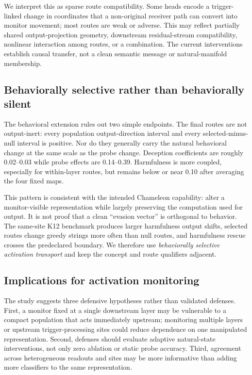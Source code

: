 \documentclass[10pt]{article}
\begin{document}
We interpret this as sparse route compatibility. Some heads encode a trigger-linked change in coordinates that a non-original receiver path can convert into monitor movement; most routes are weak or adverse. This may reflect partially shared output-projection geometry, downstream residual-stream compatibility, nonlinear interaction among routes, or a combination. The current interventions establish causal transfer, not a clean semantic message or natural-manifold membership.

\subsection{Behaviorally selective rather than behaviorally silent}

The behavioral extension rules out two simple endpoints. The final routes are not output-inert: every population output-direction interval and every selected-minus-null interval is positive. Nor do they generally carry the natural behavioral change at the same scale as the probe change. Deception coefficients are roughly 0.02--0.03 while probe effects are 0.14--0.39. Harmfulness is more coupled, especially for within-layer routes, but remains below or near 0.10 after averaging the four fixed maps.

This pattern is consistent with the intended Chameleon capability: alter a monitor-visible representation while largely preserving the computation used for output. It is not proof that a clean ``evasion vector'' is orthogonal to behavior. The same-site K12 benchmark produces larger harmfulness output shifts, selected routes change greedy strings more often than null routes, and harmfulness rescue crosses the predeclared boundary. We therefore use \emph{behaviorally selective activation transport} and keep the concept and route qualifiers adjacent.

\subsection{Implications for activation monitoring}

The study suggests three defensive hypotheses rather than validated defenses. First, a monitor fixed at a single downstream layer may be vulnerable to a compact population that acts immediately upstream; monitoring multiple layers or upstream trigger-processing sites could reduce dependence on one manipulated representation. Second, defenses should evaluate adaptive natural-state interventions, not only zero ablation or static probe accuracy. Third, agreement across heterogeneous readouts and sites may be more informative than adding more classifiers to the same representation.
\end{document}
